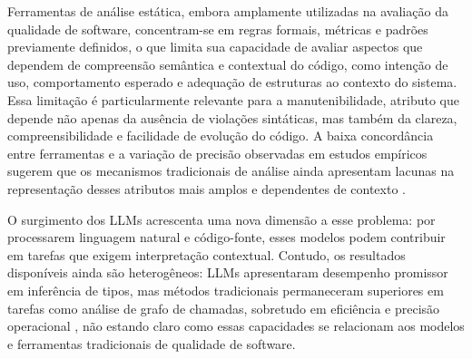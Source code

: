 

Ferramentas de análise estática, embora amplamente utilizadas na avaliação da qualidade de software, concentram-se em regras formais, métricas e padrões previamente definidos, o que limita sua capacidade de avaliar aspectos que dependem de compreensão semântica e contextual do código, como intenção de uso, comportamento esperado e adequação de estruturas ao contexto do sistema. Essa limitação é particularmente relevante para a manutenibilidade, atributo que depende não apenas da ausência de violações sintáticas, mas também da clareza, compreensibilidade e facilidade de evolução do código. A baixa concordância entre ferramentas e a variação de precisão observadas em estudos empíricos sugerem que os mecanismos tradicionais de análise ainda apresentam lacunas na representação desses atributos mais amplos e dependentes de contexto \cite{LenarduzziEtAll}.

O surgimento dos LLMs acrescenta uma nova dimensão a esse problema: por processarem linguagem natural e código-fonte, esses modelos podem contribuir em tarefas que exigem interpretação contextual. Contudo, os resultados disponíveis ainda são heterogêneos: LLMs apresentaram desempenho promissor em inferência de tipos, mas métodos tradicionais permaneceram superiores em tarefas como análise de grafo de chamadas, sobretudo em eficiência e precisão operacional \cite{VenkateshEtAll}, não estando claro como essas capacidades se relacionam aos modelos e ferramentas tradicionais de qualidade de software.

